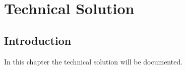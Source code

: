 \chapter{Technical Solution}
\section{Introduction}
In this chapter the technical solution will be documented.


